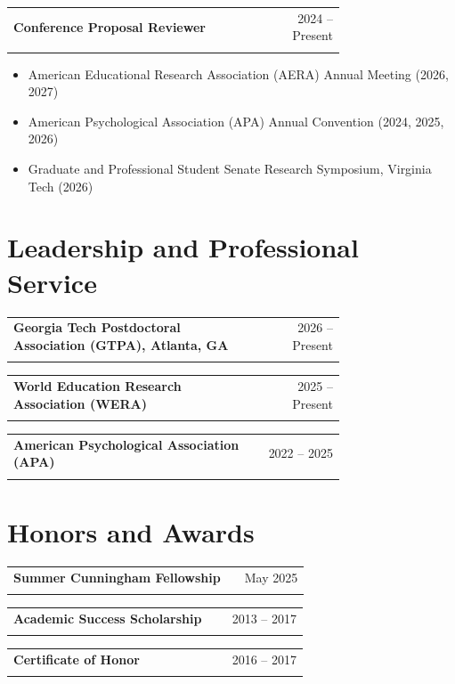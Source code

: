 \documentclass[letterpaper,11pt]{article}
\makeatletter
\newcommand{\entry}[3]{%
  \begin{tabular*}{\linewidth}[t]{@{}>{\raggedright\arraybackslash}p{0.74\linewidth}@{\extracolsep{\fill}}r@{}}
    \textbf{#1} & #2 \\
    \multicolumn{2}{@{}l@{}}{\textit{#3}} \\
  \end{tabular*}\par\vspace{1pt}}
\newenvironment{bullets}%
  {\begin{itemize}[leftmargin=1.2em, itemsep=1pt, parsep=0pt, topsep=1pt, label=\textbullet]}%
  {\end{itemize}\vspace{4pt}}
\makeatother
\begin{document}
\entry{Conference Proposal Reviewer}{2024 -- Present}{3 conferences}
\begin{bullets}
  \item American Educational Research Association (AERA) Annual Meeting (2026, 2027)
  \item American Psychological Association (APA) Annual Convention (2024, 2025, 2026)
  \item Graduate and Professional Student Senate Research Symposium, Virginia Tech (2026)
\end{bullets}

\section{Leadership and Professional Service}
\entry{Georgia Tech Postdoctoral Association (GTPA), Atlanta, GA}{2026 -- Present}
      {Board Member and Committee Chair}
\vspace{3pt}
\entry{World Education Research Association (WERA)}{2025 -- Present}
      {Volunteer Contributor, International Research Network for Motivating Students}
\vspace{3pt}
\entry{American Psychological Association (APA)}{2022 -- 2025}
      {Campus Ambassador, Virginia Tech}

\section{Honors and Awards}
\entry{Summer Cunningham Fellowship}{May 2025}
      {Virginia Tech Graduate School; awarded to support dissertation writing and defense preparation}
\vspace{3pt}
\entry{Academic Success Scholarship}{2013 -- 2017}
      {Başkent University, Türkiye; covered academic expenses, including tuition}
\vspace{3pt}
\entry{Certificate of Honor}{2016 -- 2017}
      {Başkent University, Türkiye; honor student for four semesters}

\end{document}
